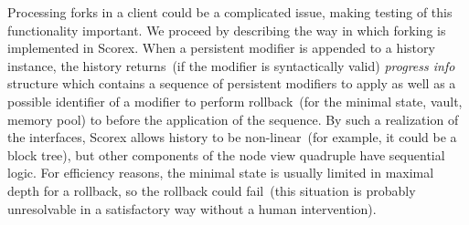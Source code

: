 Processing forks in a client could be a complicated issue, making testing of this functionality important. We proceed by describing the way in which forking is implemented in Scorex. When a persistent modifier is appended to a history instance, the history returns~(if the modifier is syntactically valid) {\em progress info} structure which contains a sequence of persistent modifiers to apply as well as a possible identifier of a modifier to perform rollback~(for the minimal state, vault, memory pool) to before the application of the sequence. By such a realization of the interfaces, Scorex allows history to be non-linear~(for example, it could be a block tree), but other components of the node view quadruple have sequential logic. For efficiency reasons, the minimal state is usually limited in maximal depth for a rollback, so the rollback could fail~(this situation is probably unresolvable in a satisfactory way without a human intervention). 
